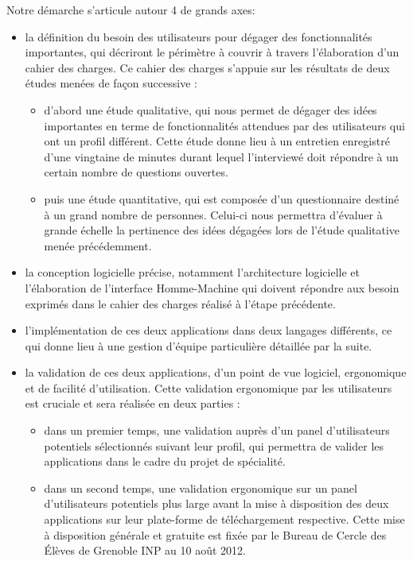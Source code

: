 \documentclass[a4paper,11pt]{article}
\begin{document}
Notre démarche s'articule autour 4 de grands axes:
\newline
\begin{itemize}
 	\item[\textbullet] la définition du besoin des utilisateurs pour dégager des fonctionnalités importantes, qui décriront le périmètre à couvrir à travers l'élaboration d'un cahier des charges. Ce cahier des charges s'appuie sur les résultats de deux études menées de façon successive : 
	\begin{itemize}
		\item d'abord une étude qualitative, qui nous permet de dégager des idées importantes en terme de fonctionnalités attendues par des utilisateurs qui ont un profil différent. Cette étude donne lieu à un entretien enregistré d'une vingtaine de minutes durant lequel l'interviewé doit répondre à un certain nombre de questions ouvertes.
		\item puis une étude quantitative, qui est composée d'un questionnaire destiné à un grand nombre de personnes. Celui-ci nous permettra d'évaluer à grande échelle la pertinence des idées dégagées lors de l'étude qualitative menée précédemment.
	\end{itemize}

	\item[\textbullet] la conception logicielle précise, notamment l'architecture logicielle et l'élaboration de l'interface Homme-Machine qui doivent répondre aux besoin exprimés dans le cahier des charges réalisé à l'étape précédente.

	\item[\textbullet] l'implémentation de ces deux applications dans deux langages différents, ce qui donne lieu à une gestion d'équipe particulière détaillée par la suite.\\
	\item[\textbullet] la validation de ces deux applications, d'un point de vue logiciel, ergonomique et de facilité d'utilisation. Cette validation ergonomique par les utilisateurs est cruciale et sera réalisée en deux parties :
	\begin{itemize}
		\item dans un premier temps, une validation auprès d'un panel d'utilisateurs potentiels sélectionnés suivant leur profil, qui permettra de valider les applications dans le cadre du projet de spécialité.
		\item dans un second temps, une validation ergonomique sur un panel d'utilisateurs potentiels plus large avant la mise à disposition des deux applications sur leur plate-forme de téléchargement respective. Cette mise à disposition générale et gratuite est fixée par le Bureau de Cercle des \'Elèves de Grenoble INP au 10 août 2012.
\\
\\
\\
	\end{itemize}
\end{itemize}
\end{document}
